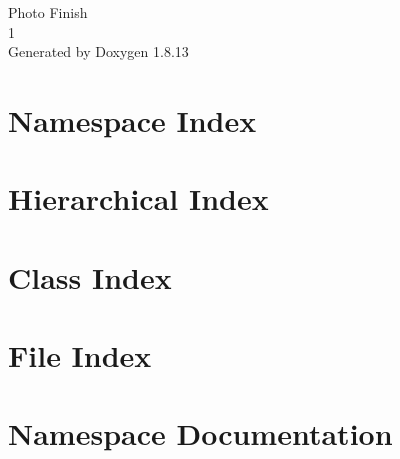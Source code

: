 \documentclass[twoside]{book}
\newcommand{\+}{\discretionary{\mbox{\scriptsize$\hookleftarrow$}}{}{}}
\newcommand{\clearemptydoublepage}{%
  \newpage{\pagestyle{empty}\cleardoublepage}%
}
\begin{document}
\hypersetup{pageanchor=false,
             bookmarksnumbered=true,
             pdfencoding=unicode
            }
\begin{titlepage}
\vspace*{7cm}
\begin{center}%
{\Large Photo Finish \\[1ex]\large 1 }\\
\vspace*{1cm}
{\large Generated by Doxygen 1.8.13}\\
\end{center}
\end{titlepage}
\clearemptydoublepage
{}
\tableofcontents
\clearemptydoublepage
{}
\hypersetup{pageanchor=true}

\chapter{Namespace Index}

\chapter{Hierarchical Index}

\chapter{Class Index}

\chapter{File Index}

\chapter{Namespace Documentation}


\end{document}
